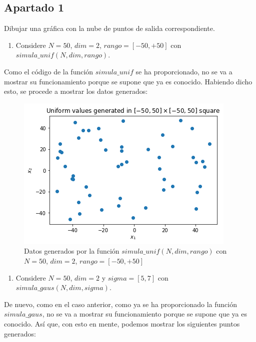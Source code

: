 \documentclass[11pt,a4paper]{article}
\begin{document}
\subsection*{Apartado 1}

\noindent Dibujar una gráfica con la nube de puntos de salida correspondiente.

\begin{enumerate}[label=\textit{\alph*})]
	\item Considere $N = 50$, $dim = 2$, $rango = [-50, +50]$ con $simula\_unif(N, dim, rango)$.
\end{enumerate}

Como el código de la función $simula\_unif$ se ha proporcionado, no se va a mostrar su funcionamiento
porque se supone que ya es conocido. Habiendo dicho esto, se procede a mostrar los datos generados:

\begin{figure}[H]
\centering
\includegraphics[scale=0.53]{img/simula_unif.png}
\caption{Datos generados por la función $simula\_unif(N, dim, rango)$ con $N = 50$, $dim = 2$,
$rango = [-50, +50]$}
\end{figure}

\begin{enumerate}[resume,label=\textit{\alph*})]
	\item Considere $N = 50$, $dim = 2$ y $sigma = [5, 7]$ con $simula\_gaus(N, dim, sigma)$.
\end{enumerate}

De nuevo, como en el caso anterior, como ya se ha proporcionado la función $simula\_gaus$, no se va
a mostrar su funcionamiento porque se supone que ya es conocido. Así que, con esto en mente, podemos
mostrar los siguientes puntos generados:
\end{document}
